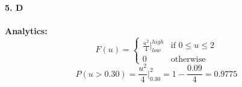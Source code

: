 \paragraph{5. D}
\paragraph{{\textbf{Analytics:}
            \begin{equation*}
                F(u) =
                \begin{cases}
                    \frac{u^2}{4} \bigg |_{low}^{high} & \text{if } 0 \leq u \leq 2 \\
                    0                                  & \text{otherwise }
                \end{cases}
            \end{equation*}
            \begin{equation*}
                P(u>0.30)=\frac{u^2}{4} \bigg |_{0.30}^{2}=1-\frac{0.09}{4}=0.9775
            \end{equation*}
        }}